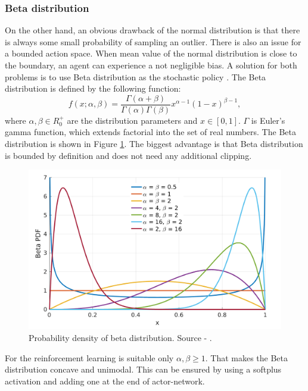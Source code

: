 \subsubsection{Beta distribution}
On the other hand, an obvious drawback of the normal distribution is that there is always some small probability of sampling an outlier. There is also an issue for a bounded action space. When mean value of the normal distribution is close to the boundary, an agent can experience a not negligible bias. A solution for both problems is to use Beta distribution as the stochastic policy \cite{chou17}. The Beta distribution is defined by the following function:
\begin{equation}
f(x;\alpha, \beta) = \frac{\Gamma(\alpha + \beta)}{\Gamma(\alpha)\Gamma(\beta)}x^{\alpha-1}(1-x)^{\beta-1},
\end{equation}
where $\alpha,\beta \in R^+_0$ are the distribution parameters and $x \in [0, 1]$. $\Gamma$ is Euler's gamma function, which extends factorial into the set of real numbers. The Beta distribution is shown in Figure \ref{fig:beta}. The biggest advantage is that Beta distribution is bounded by definition and does not need any additional clipping.

\begin{figure}[H]
\centering
\includegraphics[scale=0.2]{fig/beta.png}
\caption[Probability density of beta distribution]{Probability density of beta distribution. Source - \cite{chou17}.}
\label{fig:beta}
\end{figure}

For the reinforcement learning is suitable only $\alpha, \beta \geq 1$. That makes the Beta distribution concave and unimodal. This can be ensured by using a softplus activation and adding one at the end of actor-network.

